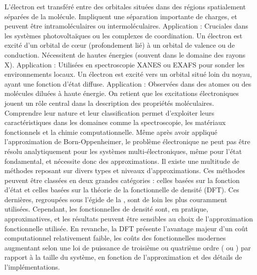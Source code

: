 {}\markdownRendererUlBeginTight
\markdownRendererUlItem L'électron est transféré entre des orbitales situées dans des régions spatialement séparées de la molécule.\markdownRendererUlItemEnd 
\markdownRendererUlItem Impliquent une séparation importante de charges, et peuvent être intramoléculaires ou intermoléculaires.\markdownRendererUlItemEnd 
\markdownRendererUlItem Application : Cruciales dans les systèmes photovoltaïques ou les complexes de coordination.\markdownRendererUlItemEnd 
\markdownRendererUlEndTight \markdownRendererOlItemEnd 
{}\markdownRendererInterblockSeparator
{}\markdownRendererUlBeginTight
\markdownRendererUlItem Un électron est excité d'un orbital de cœur (profondement lié) à un orbital de valence ou de conduction.\markdownRendererUlItemEnd 
\markdownRendererUlItem Nécessitent de hautes énergies (souvent dans le domaine des rayons X).\markdownRendererUlItemEnd 
\markdownRendererUlItem Application : Utilisées en spectroscopie XANES ou EXAFS pour sonder les environnements locaux.\markdownRendererUlItemEnd 
\markdownRendererUlEndTight \markdownRendererOlItemEnd 
{}\markdownRendererInterblockSeparator
{}\markdownRendererUlBeginTight
\markdownRendererUlItem Un électron est excité vers un orbital situé loin du noyau, ayant une fonction d'état diffuse.\markdownRendererUlItemEnd 
\markdownRendererUlItem Application : Observées dans des atomes ou des molécules diluées à haute énergie.\markdownRendererUlItemEnd 
\markdownRendererUlEndTight \markdownRendererOlItemEnd 
\markdownRendererOlEnd \markdownRendererInterblockSeparator
{}On retient que les excitations électroniques jouent un rôle central dans la description des propriétés moléculaires. Comprendre leur nature et leur classification permet d’exploiter leurs caractéristiques dans les domaines comme la spectroscopie, les matériaux fonctionnels et la chimie computationnelle.\markdownRendererParagraphSeparator
{}Même après avoir appliqué l'approximation de Born-Oppenheimer, le problème électronique ne peut pas être résolu analytiquement pour les systèmes multi-électroniques, même pour l'état fondamental, et nécessite donc des approximations. Il existe une multitude de méthodes reposant sur divers types et niveaux d'approximations. Ces méthodes peuvent être classées en deux grandes catégories : celles basées sur la fonction d'état et celles basées sur la théorie de la fonctionnelle de densité (DFT). Ces dernières, regroupées sous l'égide de la , sont de loin les plus couramment utilisées. Cependant, les fonctionnelles de densité sont, en pratique, approximatives, et les résultats peuvent être sensibles au choix de l'approximation fonctionnelle utilisée. En revanche, la DFT présente l'avantage majeur d'un coût computationnel relativement faible, les coûts des fonctionnelles modernes augmentant selon une loi de puissance de troisième ou quatrième ordre ( ou ) par rapport à la taille du système, en fonction de l'approximation et des détails de l'implémentations.\markdownRendererParagraphSeparator
